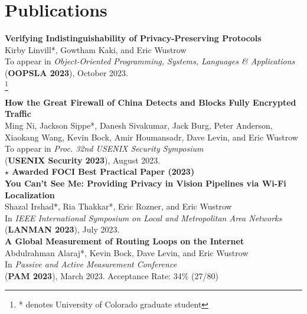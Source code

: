 \documentclass[margin,11pt]{res} %
\newcommand\blfootnote[1]{%
    \begingroup
    \renewcommand\thefootnote{}\footnote{#1}%
    \addtocounter{footnote}{-1}%
    \endgroup
}
\begin{document}

\vspace{6pt}
\section{\large Publications}

    \textbf{Verifying Indistinguishability of Privacy-Preserving Protocols} \\
    Kirby Linvill*, Gowtham Kaki, and Eric Wustrow \\
    To appear in \emph{Object-Oriented Programming, Systems, Languages \& Applications} \\
    (\textbf{OOPSLA 2023}), October 2023. \\
    \blfootnote{* denotes University of Colorado graduate student}

    \textbf{How the Great Firewall of China Detects and Blocks Fully Encrypted Traffic} \\
    Ming Ni, Jackson Sippe*, Danesh Sivakumar, Jack Burg, Peter Anderson, Xiaokang Wang, Kevin Bock, Amir Houmansadr, Dave Levin, and Eric Wustrow \\
    To appear in \emph{Proc. 32nd USENIX Security Symposium} \\
    (\textbf{USENIX Security 2023}), August 2023. \\
    \textbf{$\star$ Awarded FOCI Best Practical Paper (2023)} \\

    \textbf{You Can't See Me: Providing Privacy in Vision Pipelines via Wi-Fi Localization} \\
    Shazal Irshad*, Ria Thakkar*, Eric Rozner, and Eric Wustrow \\
    In \emph{IEEE International Symposium on Local and Metropolitan Area Networks} \\
    (\textbf{LANMAN 2023}), July 2023. \\

    \textbf{A Global Measurement of Routing Loops on the Internet} \\
    Abdulrahman Alaraj*, Kevin Bock, Dave Levin, and Eric Wustrow \\
    In \emph{Passive and Active Measurement Conference} \\
    (\textbf{PAM 2023}), March 2023.
    Acceptance Rate: 34\% (27/80) \\
\end{document}
